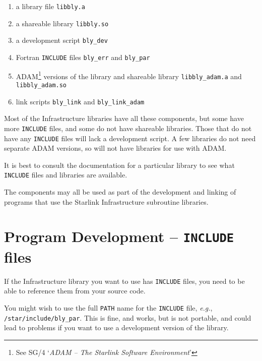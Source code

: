 \documentclass[twoside,11pt]{article}
\newcommand{\xlabel}[1]{}
\begin{document}
\begin{enumerate}

\item a library file \texttt{libbly.a}

\item a shareable library \texttt{libbly.so} 

\item a development script \texttt{bly\_dev}

\item Fortran \texttt{INCLUDE} files \texttt{bly\_err} and \texttt{bly\_par}

\item ADAM\footnote{See SG/4 `\emph{ADAM -- The Starlink Software
Environment}'} versions of the library and shareable library
\texttt{libbly\_adam.a} and \texttt{libbly\_adam.so}

\item link scripts \texttt{bly\_link} and \texttt{bly\_link\_adam}

\end{enumerate}

Most of the Infrastructure libraries have all these components, but some
have more \texttt{INCLUDE} files, and some do not have shareable libraries.
Those that do not have any \texttt{INCLUDE} files will lack a development
script.  A few libraries do not need separate ADAM versions, so will not
have libraries for use with ADAM.

It is best to consult the documentation for a particular library to see 
what \texttt{INCLUDE} files and libraries are available.

The components may all be used as part of the development and linking of 
programs that use the Starlink Infrastructure subroutine libraries.

\section{\xlabel{program_development}Program Development -- \texttt{INCLUDE} files}
\label{program_development}

If the Infrastructure library you want to use has \texttt{INCLUDE} files, you
need to be able to reference them from your source code. 

You might wish to use the full \texttt{PATH} name for the \texttt{INCLUDE}
file, \emph{e.g.}, \texttt{/star/include/bly\_par}.  This is fine, and works,
but is not portable, and could lead to problems if you want to use a
development version of the library. 
\end{document}
